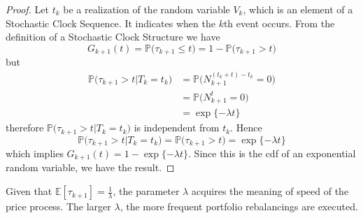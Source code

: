 \begin{proof}
	Let $t_k$ be a realization of the random variable $V_k$, which is an element of a Stochastic Clock Sequence. It indicates when the $k$th event occurs. From the definition of a Stochastic Clock Structure we have
	\[
	G_{k+1}(t)= \mathbb{P}\big(\tau_{k+1}\leq t\big) = 1 - \mathbb{P}\big(\tau_{k+1}> t\big)
	\]
	but 
	\begin{align*}
	\mathbb{P}\big(\tau_{k+1}>t \lvert T_k = t_k\big) &= \mathbb{P}\big(N^{(t_k+t)-t_k}_{k+1}=0\big)\\
	& =\mathbb{P}\big(N^{t}_{k+1}=0\big)  \\
	& = \exp\{-\lambda t \}
	\end{align*}
	therefore $\mathbb{P}\big(\tau_{k+1}>t \lvert T_k = t_k\big)$ is independent from $t_k$. Hence 
	\[
	\mathbb{P}\big(\tau_{k+1}>t \lvert T_k = t_k\big) = \mathbb{P}\big(\tau_{k+1}> t\big) = \exp\{-\lambda t \} 
	\]
	which implies $G_{k+1}(t)=1-\exp\{-\lambda t \}$. Since this is the cdf of an exponential random variable, we have the result.
\end{proof}
\begin{remark}
	Given that $\mathbb{E}[\tau_{k+1}]=\frac{1}{\lambda}$, the parameter $\lambda$ acquires the meaning of speed of the price process. The larger $\lambda$, the more frequent portfolio rebalancings are executed.
\end{remark}
